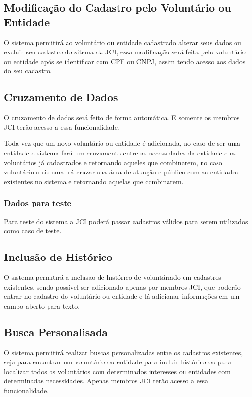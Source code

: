     \subsection{Modificação do Cadastro pelo Voluntário ou Entidade}
    O sistema permitirá ao voluntário ou entidade cadastrado alterar seus dados ou excluir seu cadastro do sitema da JCI, essa modificação será feita pelo 
    voluntário ou entidade após se identificar com CPF ou CNPJ, assim tendo acesso aos dados do seu cadastro.

    \subsection{Cruzamento de Dados}
    O cruzamento de dados será feito de forma automática. E somente os membros JCI terão acesso a essa funcionalidade.

    Toda vez que um novo voluntário ou entidade é adicionada, no caso de ser uma entidade o sistema fará um cruzamento entre as necessidades da entidade 
    e os voluntários já cadastrados e retornando aqueles que combinarem, no caso voluntário o sistema irá cruzar sua área de atuação e público com as entidades 
    existentes no sistema e retornando aquelas que combinarem.

    \subsubsection{Dados para teste}
    Para teste do sistema a JCI poderá passar cadastros válidos para serem utilizados como caso de teste.

    \subsection{Inclusão de Histórico}
    O sistema permitirá a inclusão de histórico de voluntáriado em cadastros existentes, sendo possível ser adicionado apenas por membros JCI, que poderão entrar 
    no cadastro do voluntário ou entidade e lá adicionar informações em um campo aberto para texto.

    \subsection{Busca Personalisada}
    O sistema permitirá realizar buscas personalizadas entre os cadastros existentes, seja para encontrar um voluntário ou entidade para incluir histórico ou para 
    localizar todos os voluntários com determinados interesses ou entidades com determinadas necessidades. Apenas membros JCI terão acesso a essa funcionalidade. 

